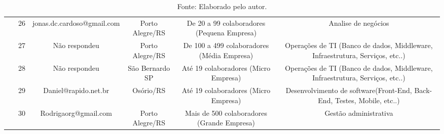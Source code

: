 \documentclass[twoside,english,brazilian]{UNISINOSartigo}
\newcommand{\source}[1]{\caption*{Fonte: {#1}} }
\begin{document}
\begin{table}[h]
\begin{tabularx}{\columnwidth}{cccccc}
~ & 26 & jonas.dc.cardoso@gmail.com & Porto Alegre/RS & De 20 a 99 colaboradores (Pequena Empresa) & Analise de negócios \\
~ & 27 & Não respondeu & Porto Alegre/RS & De 100 a 499 colaboradores (Média Empresa) & Operações de TI (Banco de dados, Middleware, Infraestrutura, Serviços, etc..) \\
~ & 28 & Não respondeu & São Bernardo SP & Até 19 colaboradores (Micro Empresa) & Operações de TI (Banco de dados, Middleware, Infraestrutura, Serviços, etc..) \\
~ & 29 & Daniel@rapido.net.br  & Osório/RS  & Até 19 colaboradores (Micro Empresa) & Desenvolvimento de software(Front-End, Back-End, Testes, Mobile, etc..) \\
~ & 30 & Rodrigaorg@gmail.com & Porto Alegre/RS & Mais de 500 colaboradores (Grande Empresa) & Gestão administrativa \\ 
\hline
    \end{tabularx}
    \source{Elaborado pelo autor.}
\end{table}
\end{document}
